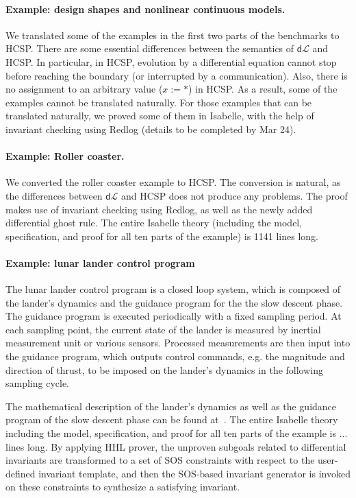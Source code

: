 \documentclass[runningheads,a4paper]{llncs}
\newcommand{\dL}{\mathsf{d}\mathcal{L}}
\begin{document}
\paragraph{Example: design shapes and nonlinear continuous models.}

We translated some of the examples in the first two parts of the
benchmarks to HCSP. There are some essential differences between the
semantics of $\dL$ and HCSP. In particular, in HCSP, evolution by a
differential equation cannot stop before reaching the boundary (or
interrupted by a communication). Also, there is no assignment to an
arbitrary value ($x := *$) in HCSP. As a result, some of the examples
cannot be translated naturally. For those examples that can be
translated naturally, we proved some of them in Isabelle, with the
help of invariant checking using Redlog (details to be completed by
Mar 24).

\paragraph{Example: Roller coaster.}

We converted the roller coaster example \cite{coasterx} to HCSP. The
conversion is natural, as the differences between $\dL$ and HCSP does
not produce any problems. The proof makes use of invariant checking
using Redlog, as well as the newly added differential ghost rule. The
entire Isabelle theory (including the model, specification, and proof
for all ten parts of the example) is 1141 lines long.

\paragraph{Example: lunar lander control program}
The lunar lander control program is a closed loop system, which is composed of the lander's dynamics and the guidance program for the the slow descent phase. The guidance program is executed periodically with a fixed sampling period. At each sampling point, the current state of the lander is measured by inertial measurement unit or various sensors. Processed measurements are then input into the guidance program, which outputs control commands, e.g. the magnitude and direction of thrust, to be imposed on the lander's dynamics in the following sampling cycle.

The mathematical description of the lander's dynamics as well as the guidance program of the slow descent phase can be found at~\cite{ZYZG14,ZhanWZ16}.  The entire Isabelle theory including the model, specification, and proof for all ten parts of the example is ... lines long.  By applying HHL prover, the unproven subgoals related to differential invariants are transformed to a set of SOS constraints with respect to the user-defined invariant template, and then the SOS-based invariant generator is invoked on these constraints to synthesize a satisfying invariant.






\end{document}
